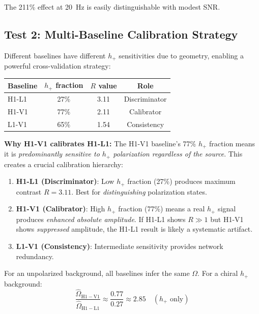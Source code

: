 \documentclass[twocolumn,prd,superscriptaddress,nofootinbib]{revtex4-2}
\begin{document}
The 211\% effect at 20~Hz is easily distinguishable with modest SNR.

\subsection{Test 2: Multi-Baseline Calibration Strategy}

Different baselines have different $h_+$ sensitivities due to geometry, enabling a powerful cross-validation strategy:

\begin{center}
\begin{tabular}{lccc}
\hline
Baseline & $h_+$ fraction & $R$ value & Role \\
\hline
H1-L1 & 27\% & 3.11 & Discriminator \\
H1-V1 & 77\% & 2.11 & Calibrator \\
L1-V1 & 65\% & 1.54 & Consistency \\
\hline
\end{tabular}
\end{center}

\textbf{Why H1-V1 calibrates H1-L1:} The H1-V1 baseline's 77\% $h_+$ fraction means it is \emph{predominantly sensitive to $h_+$ polarization regardless of the source}. This creates a crucial calibration hierarchy:

\begin{enumerate}
\item \textbf{H1-L1 (Discriminator)}: Low $h_+$ fraction (27\%) produces maximum contrast $R = 3.11$. Best for \emph{distinguishing} polarization states.

\item \textbf{H1-V1 (Calibrator)}: High $h_+$ fraction (77\%) means a real $h_+$ signal produces \emph{enhanced absolute amplitude}. If H1-L1 shows $R \gg 1$ but H1-V1 shows \emph{suppressed} amplitude, the H1-L1 result is likely a systematic artifact.

\item \textbf{L1-V1 (Consistency)}: Intermediate sensitivity provides network redundancy.
\end{enumerate}

For an unpolarized background, all baselines infer the same $\Omega$. For a chiral $h_+$ background:
\begin{equation}
\boxed{\frac{\hat{\Omega}_{\mathrm{H1-V1}}}{\hat{\Omega}_{\mathrm{H1-L1}}} \approx \frac{0.77}{0.27} \approx 2.85 \quad (h_+ \text{ only})}
\end{equation}
\end{document}
